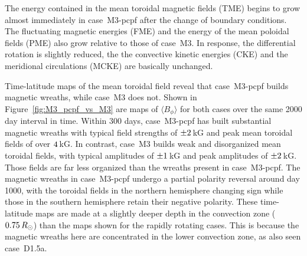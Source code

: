 The energy contained in the mean toroidal magnetic fields (TME) begins
to grow almost immediately in case~M3-pcpf after the change of boundary conditions.
The fluctuating magnetic energies (FME) and the energy of the mean
poloidal fields (PME) also grow relative to those of case~M3.  In
response, the differential rotation is slightly reduced, the the
convective kinetic energies (CKE) and the meridional circulations
(MCKE) are basically unchanged.

Time-latitude maps of the mean toroidal field reveal that
case~M3-pcpf builds magnetic wreaths, while case~M3 does not.  Shown
in Figure~\ref{fig:M3_pcpf_vs_M3} are maps of $\langle B_\phi \rangle$
for both cases over the same 2000 day interval in time.  Within 300
days, case~M3-pcpf has built substantial magnetic wreaths with typical
field strengths of $\pm 2\thinspace$kG and peak mean toroidal fields of
over $4\thinspace$kG.  In contrast, case~M3 builds weak and
disorganized mean toroidal fields, with typical amplitudes of
$\pm1\thinspace$kG and peak amplitudes of $\pm 2\thinspace$kG.  Those
fields are far less organized than the wreaths present in
case~M3-pcpf.  The magnetic wreaths in case~M3-pcpf undergo a partial
polarity reversal around day 1000, with the toroidal fields in the
northern hemisphere changing sign while those in the southern
hemisphere retain their negative polarity.
These time-latitude maps are made at a slightly deeper
depth in the convection zone ($0.75\thinspace R_\odot$) than the maps
shown for the rapidly rotating cases.  This is because the magnetic
wreaths here are concentrated in the lower convection zone, as also
seen case~D1.5a.

